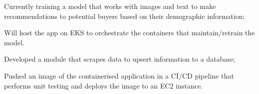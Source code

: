 \documentclass[]{plushcv}
\begin{document}
\begin{minipage}[t]{0.70\textwidth}


\begin{tightemize}
\item Currently training a model that works with images and text to make recommendations to potential buyers based on their demographic information;
\item Will host the app on EKS to orchestrate the containers that maintain/retrain the model.
\end{tightemize}
\sectionsep

\begin{tightemize}
\item Developed a module that scrapes data to upsert information to a database;
\item Pushed an image of the containerised application in a CI/CD pipeline that performs unit testing and deploys the image to an EC2 instance.
\end{tightemize}
\sectionsep


\end{minipage}
\end{document}

